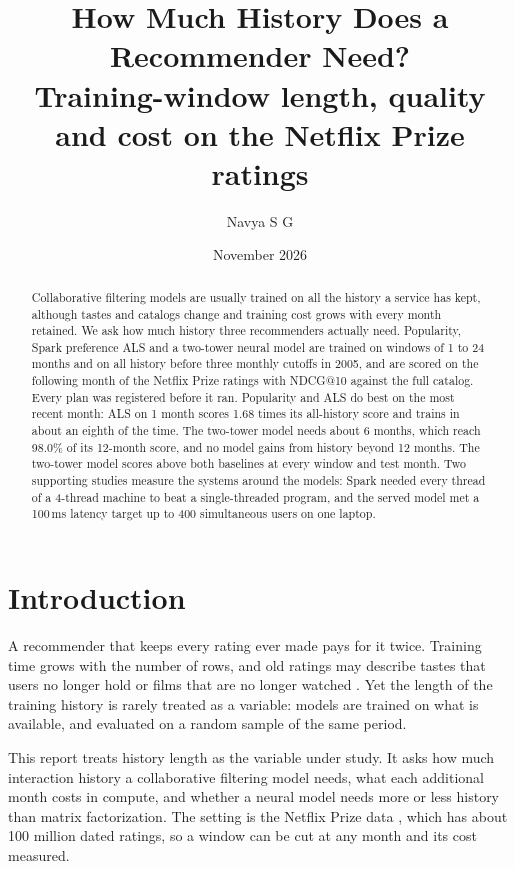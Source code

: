 \documentclass[11pt]{article}
\title{How Much History Does a Recommender Need?\\[0.3em]
\large Training-window length, quality and cost on the Netflix Prize ratings}
\author{Navya S G}
\date{November 2026}
\begin{document}
\maketitle

\begin{abstract}
Collaborative filtering models are usually trained on all the history a service has kept,
although tastes and catalogs change and training cost grows with every month retained. We ask
how much history three recommenders actually need. Popularity, Spark preference ALS and a
two-tower neural model are trained on windows of 1 to 24 months and on all history before three
monthly cutoffs in 2005, and are scored on the following month of the Netflix Prize ratings with
NDCG@10 against the full catalog. Every plan was registered before it ran. Popularity and ALS
do best on the most recent month: ALS on 1 month scores 1.68 times its all-history score and
trains in about an eighth of the time. The two-tower model needs about 6 months, which reach
98.0\% of its 12-month score, and no model gains from history beyond 12 months. The two-tower
model scores above both baselines at every window and test month. Two supporting studies measure
the systems around the models: Spark needed every thread of a 4-thread machine to beat a
single-threaded program, and the served model met a 100\,ms latency target up to 400 simultaneous
users on one laptop.
\end{abstract}

\section{Introduction}

A recommender that keeps every rating ever made pays for it twice. Training time grows with the
number of rows, and old ratings may describe tastes that users no longer hold or films that are
no longer watched \citep{koren2009temporal}. Yet the length of the training history is rarely
treated as a variable: models are trained on what is available, and evaluated on a random sample
of the same period.

This report treats history length as the variable under study. It asks how much interaction
history a collaborative filtering model needs, what each additional month costs in compute, and
whether a neural model needs more or less history than matrix factorization. The setting is the
Netflix Prize data \citep{bennett2007netflix}, which has about 100 million dated ratings, so a
window can be cut at any month and its cost measured.
\end{document}
